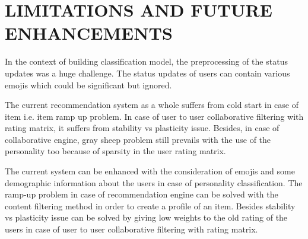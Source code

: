 \cleardoublepage
\section{LIMITATIONS AND FUTURE ENHANCEMENTS}
In the context of building classification model, the preprocessing of the status updates was a huge challenge. The status updates of users can contain various emojis which could be significant but ignored. 

The current recommendation system as a whole suffers from cold start in case of item i.e. item ramp up problem. In case of user to user collaborative filtering with rating matrix, it suffers from stability vs plasticity issue. Besides, in case of collaborative engine, gray sheep problem still prevails with the use of the personality too because of sparsity in the user rating matrix.

The current system can be enhanced with the consideration of emojis and some demographic information about the users in case of personality classification. The ramp-up problem in case of recommendation engine can be solved with the content filtering method in order to create a profile of an item. Besides stability vs plasticity issue can be solved by giving low weights to the old rating of the users in case of user to user collaborative filtering with rating matrix.
